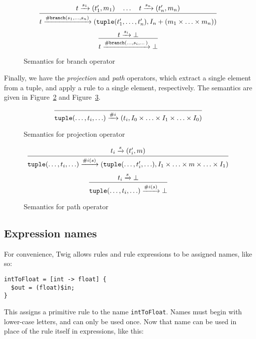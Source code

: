 \begin{figure}[ht]
\label{semantics:branch}
\[
\infer{
  t \arr{\mathtt{\#branch}(s_1,\ldots,s_n)}
  (\mathtt{tuple}(t_1',\ldots,t_n'),I_n + (m_1 \times \ldots \times m_n))
}{t \arr{s_1} (t_1',m_1) \quad \ldots \quad t \arr{s_n} (t_n',m_n)}
\]
\[
\infer
{t \arr{\mathtt{\#branch}(\ldots,s_i,\dots)} \bot}
{t \arr{s_i} \bot}
\]
\caption{Semantics for branch operator}
\end{figure}


Finally, we have the \emph{projection} and \emph{path} operators, which
extract a single element from a tuple, and apply a rule to a single element,
respectively. The semantics are given in Figure~\ref{semantics:projection} and
Figure~\ref{semantics:path}.


\begin{figure}[ht]
\label{semantics:projection}
\[
\infer{\mathtt{tuple}(\ldots,t_i,\ldots) \arr{\#i} 
(t_i,I_0 \times \ldots \times I_1 \times \ldots \times I_0)}{}
\]
\caption{Semantics for projection operator}
\end{figure}


\begin{figure}[ht]
\label{semantics:path}
\[
\infer{\mathtt{tuple}(\ldots,t_i,\ldots) \arr{\#i(s)}
(\mathtt{tuple}(\ldots,t_i',\ldots),
I_1 \times \ldots \times m \times \ldots \times I_1)}
{t_i \arr{s} (t_i',m)}
\]
\[
\infer{\mathtt{tuple}(\ldots,t_i,\ldots) \arr{\#i(s)} \bot}
{t_i \arr{s} \bot}
\]
\caption{Semantics for path operator}
\end{figure}


\subsection{Expression names}
\label{section:names}

For convenience, Twig allows rules and rule expressions to be assigned names,
like so:

\begin{verbatim}
intToFloat = [int -> float] {
  $out = (float)$in;
}
\end{verbatim}

This assigns a primitive rule to the name \texttt{intToFloat}. Names must
begin with lower-case letters, and can only be used once. Now that name can be
used in place of the rule itself in expressions, like this:

